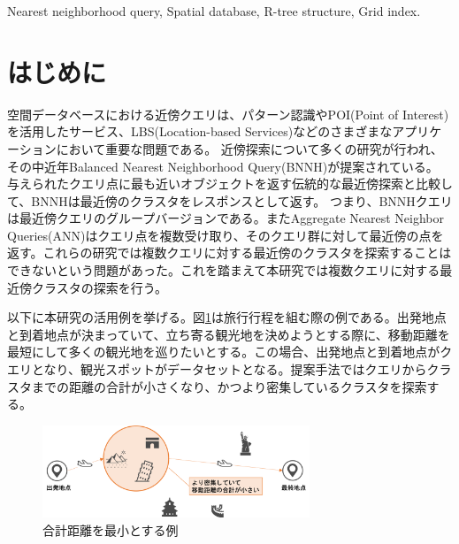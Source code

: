 \documentclass{deimj}
\begin{document}
\pagestyle{empty}
\begin{jkeyword}
Nearest neighborhood query, Spatial database, R-tree structure, Grid index.
\end{jkeyword}
\maketitle

\section{はじめに}

空間データベースにおける近傍クエリは、パターン認識やPOI(Point of Interest)を活用したサービス、LBS(Location-based Services)などのさまざまなアプリケーションにおいて重要な問題である。 近傍探索について多くの研究が行われ、その中近年Balanced Nearest Neighborhood Query(BNNH)\cite{NNH}が提案されている。 与えられたクエリ点に最も近いオブジェクトを返す伝統的な最近傍探索と比較して、BNNHは最近傍のクラスタをレスポンスとして返す。 つまり、BNNHクエリは最近傍クエリのグループバージョンである。またAggregate Nearest Neighbor Queries(ANN)\cite{ANN}はクエリ点を複数受け取り、そのクエリ群に対して最近傍の点を返す。これらの研究では複数クエリに対する最近傍のクラスタを探索することはできないという問題があった。これを踏まえて本研究では複数クエリに対する最近傍クラスタの探索を行う。

以下に本研究の活用例を挙げる。図\ref{fig:ex-sum}は旅行行程を組む際の例である。出発地点と到着地点が決まっていて、立ち寄る観光地を決めようとする際に、移動距離を最短にして多くの観光地を巡りたいとする。この場合、出発地点と到着地点がクエリとなり、観光スポットがデータセットとなる。提案手法ではクエリからクラスタまでの距離の合計が小さくなり、かつより密集しているクラスタを探索する。

\begin{figure}[H]
	\centering
    \includegraphics[width=8cm]{images/ex-sum.png}
    \caption{合計距離を最小とする例}
    \label{fig:ex-sum}
\end{figure}
\end{document}
